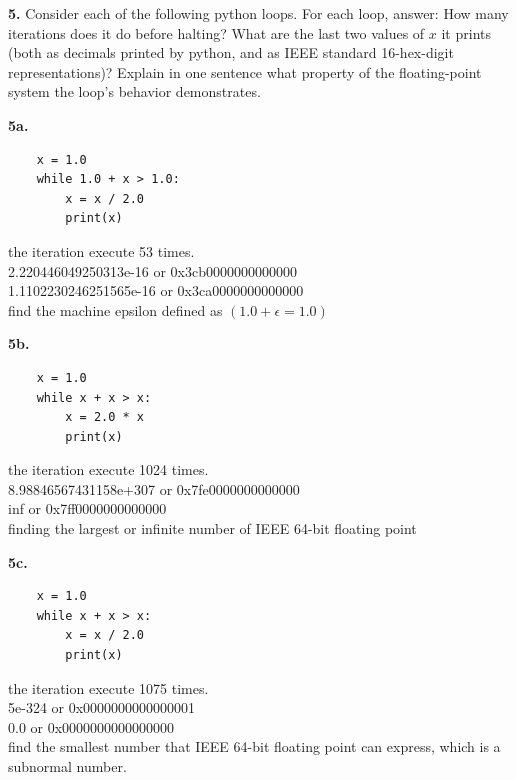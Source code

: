 \documentclass[11pt]{article}
\begin{document}
\par\bigskip
{\bf 5.}
Consider each of the following python loops.
For each loop, answer:
How many iterations does it do before halting?
What are the last two values of $x$ it prints
(both as decimals printed by python, and as
IEEE standard 16-hex-digit representations)?
Explain in one sentence what
property of the floating-point system 
the loop's behavior demonstrates.

\par\medskip
{\bf 5a.}
\begin{verbatim}
    x = 1.0
    while 1.0 + x > 1.0:
        x = x / 2.0
        print(x)
\end{verbatim}
the iteration execute 53 times.\\
2.220446049250313e-16 or 0x3cb0000000000000\\
1.1102230246251565e-16 or 0x3ca0000000000000\\
find the machine epsilon defined as $(1.0+\epsilon=1.0)$

\par\medskip
{\bf 5b.}
\begin{verbatim}
    x = 1.0
    while x + x > x:
        x = 2.0 * x
        print(x)
\end{verbatim}
the iteration execute 1024 times.\\
8.98846567431158e+307 or 0x7fe0000000000000\\
inf or 0x7ff0000000000000
\\finding the largest or infinite number of IEEE 64-bit floating point
\par\medskip
{\bf 5c.}
\begin{verbatim}
    x = 1.0
    while x + x > x:
        x = x / 2.0
        print(x)
\end{verbatim}
the iteration execute 1075 times.\\
5e-324 or 0x0000000000000001\\
0.0 or 0x0000000000000000\\
find the smallest number that IEEE 64-bit floating point can express, which is a subnormal number.
\end{document}
